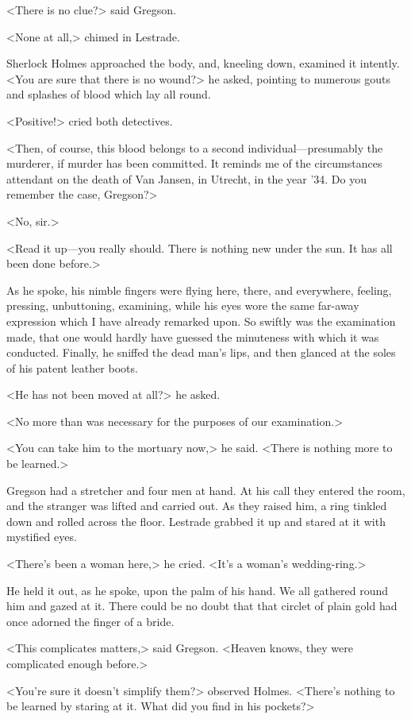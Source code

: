 <There is no clue?> said Gregson.

<None at all,> chimed in Lestrade.

Sherlock Holmes approached the body, and, kneeling down, examined it intently. <You are sure that there is no wound?> he asked, pointing to numerous gouts and splashes of blood which lay all round.

<Positive!> cried both detectives.

<Then, of course, this blood belongs to a second individual—presumably the murderer, if murder has been committed. It reminds me of the circumstances attendant on the death of Van Jansen, in Utrecht, in the year '34. Do you remember the case, Gregson?>

<No, sir.>

<Read it up—you really should. There is nothing new under the sun. It has all been done before.>

As he spoke, his nimble fingers were flying here, there, and everywhere, feeling, pressing, unbuttoning, examining, while his eyes wore the same far-away expression which I have already remarked upon. So swiftly was the examination made, that one would hardly have guessed the minuteness with which it was conducted. Finally, he sniffed the dead man's lips, and then glanced at the soles of his patent leather boots.

<He has not been moved at all?> he asked.

<No more than was necessary for the purposes of our examination.>

<You can take him to the mortuary now,> he said. <There is nothing more to be learned.>

Gregson had a stretcher and four men at hand. At his call they entered the room, and the stranger was lifted and carried out. As they raised him, a ring tinkled down and rolled across the floor. Lestrade grabbed it up and stared at it with mystified eyes.

<There's been a woman here,> he cried. <It's a woman's wedding-ring.>

He held it out, as he spoke, upon the palm of his hand. We all gathered round him and gazed at it. There could be no doubt that that circlet of plain gold had once adorned the finger of a bride.

<This complicates matters,> said Gregson. <Heaven knows, they were complicated enough before.>

<You're sure it doesn't simplify them?> observed Holmes. <There's nothing to be learned by staring at it. What did you find in his pockets?>

